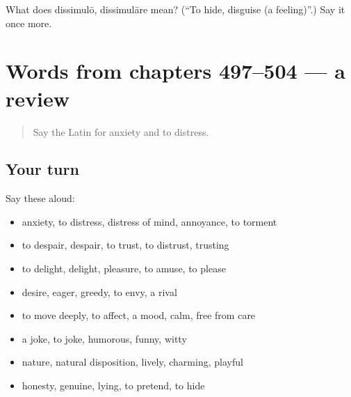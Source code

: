 \begin{tcolorbox}[breakable,colback=teal!4,colframe=teal!35!black,title={Before you move on}]
What does dissimulō, dissimulāre mean? (\textquotedblleft{}To hide, disguise (a feeling)\textquotedblright{}.) Say it once more.
\end{tcolorbox}
\section[(dialogue)]{Words from chapters 497–504 — a review}

\label{lesson:LA-R504-review-497-504}



\begin{quote}
Say the Latin for anxiety and to distress.
\end{quote}

\subsection*{Your turn}
Say these aloud:

\begin{itemize}
\raggedright
  \item anxiety, to distress, distress of mind, annoyance, to torment
  \item to despair, despair, to trust, to distrust, trusting
  \item to delight, delight, pleasure, to amuse, to please
  \item desire, eager, greedy, to envy, a rival
  \item to move deeply, to affect, a mood, calm, free from care
  \item a joke, to joke, humorous, funny, witty
  \item nature, natural disposition, lively, charming, playful
  \item honesty, genuine, lying, to pretend, to hide
\end{itemize}

